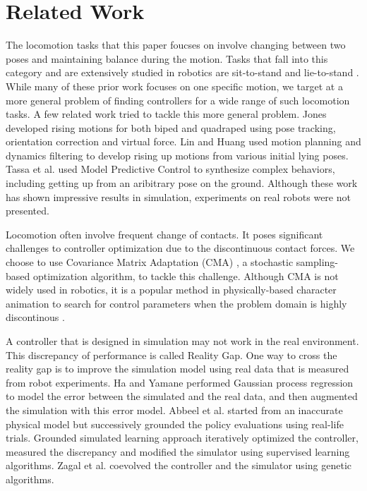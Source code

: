 \section{Related Work}

The locomotion tasks that this paper foucses on involve changing between two poses and maintaining balance during the motion. Tasks that fall into this category and are extensively studied in robotics are sit-to-stand \cite{Faloutsos:2003,Iida:2004,Pchelkin:2010,Mistry:2010,Bahar:2014} and lie-to-stand \cite{morimoto:1998,Faloutsos:2001,Kanehiro:2007,Hirukawa:2005}. While many of these prior work focuses on one specific motion, we target at a more general problem of finding controllers for a wide range of such locomotion tasks. A few related work tried to tackle this more general problem. Jones \cite{jones:2011} developed rising motions for both biped and quadraped using pose tracking, orientation correction and virtual force. Lin and Huang \cite{lin:2012} used motion planning and dynamics filtering to develop rising up motions from various initial lying poses. Tassa et al. \cite{tassa:2012} used Model Predictive Control to synthesize complex behaviors, including getting up from an aribitrary pose on the ground. Although these work has shown impressive results in simulation, experiments on real robots were not presented.

Locomotion often involve frequent change of contacts. It poses significant challenges to controller optimization due to the discontinuous contact forces. We choose to use Covariance Matrix Adaptation (CMA) \cite{Hansen:2009}, a stochastic sampling-based optimization algorithm, to tackle this challenge. Although CMA is not widely used in robotics, it is a popular method in physically-based character animation to search for control parameters when the problem domain is highly discontinous \cite{Wu:2010, Wang:2010, Tan:2014}.

A controller that is designed in simulation may not work in the real environment. This discrepancy of performance is called Reality Gap. One way to cross the reality gap is to improve the simulation model using real data that is measured from robot experiments. Ha and Yamane \cite{HA:2015} performed Gaussian process regression to model the error between the simulated and the real data, and then augmented the simulation with this error model. Abbeel et al. \cite{Abbeel:2006} started from an inaccurate physical model but successively grounded the policy evaluations using real-life trials. Grounded simulated learning approach \cite{Farchy:2013} iteratively optimized the controller, measured the discrepancy and modified the simulator using supervised learning algorithms. Zagal et al. \cite{zagal2004} coevolved the controller and the simulator using genetic algorithms.

